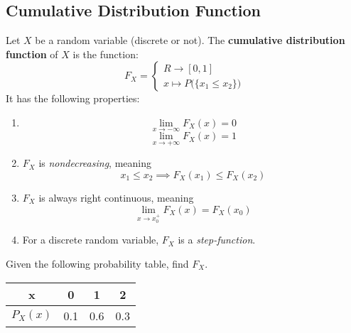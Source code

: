 \documentclass{article}
\begin{document}
\subsection{Cumulative Distribution Function}
\begin{defn}
	Let $X$ be a random variable (discrete or not). The \textbf{cumulative distribution function} of $X$ is the function:
	$$ F_X = \begin{cases}
	R \to [0,1] \\
	x \mapsto P \big( \{ x_1 \leq x_2 \} \big)
	\end{cases}$$
	It has the following properties:
	\begin{multicols}{2}
		\begin{enumerate}[(1)]
			\item $$\lim\limits_{x \to - \infty} F_X (x) = 0$$ $$\lim\limits_{x \to + \infty} F_X (x) = 1$$ 
			\item $F_X$ is \emph{nondecreasing}, meaning $$x_1 \leq x_2 \implies F_X(x_1) \leq F_X(x_2)$$
			\item $F_X$ is always right continuous, meaning $$\lim_{x \to x_0^+} F_X(x) = F_X(x_0) $$
			\item For a discrete random variable, $F_X$ is a \emph{step-function}.
		\end{enumerate}
	\end{multicols}
\end{defn}
\begin{exmp}
	Given the following probability table, find $F_X$.
	\begin{table}[h]
		\begin{tabular}{c|c|c|c}
			x  & 0        & 1 & 2        \\ \hline
			$P_X(x)$ & 0.1 & 0.6 & 0.3
		\end{tabular}
	\end{table}
\end{exmp}
\vfill
\end{document}
